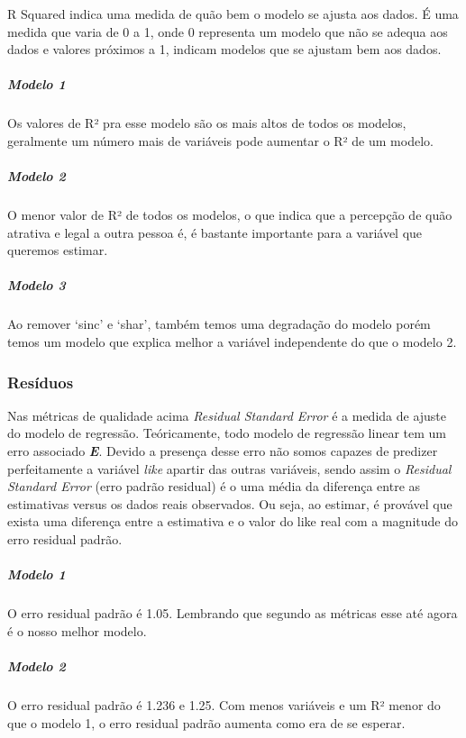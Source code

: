 \documentclass[]{article}
\let\oldsubparagraph\subparagraph
\renewcommand{\subparagraph}[1]{\oldsubparagraph{#1}\mbox{}}
\begin{document}
R Squared indica uma medida de quão bem o modelo se ajusta aos dados. É
uma medida que varia de 0 a 1, onde 0 representa um modelo que não se
adequa aos dados e valores próximos a 1, indicam modelos que se ajustam
bem aos dados.

\hypertarget{modelo-1-2}{%
\subparagraph{Modelo 1}\label{modelo-1-2}}

Os valores de R² pra esse modelo são os mais altos de todos os modelos,
geralmente um número mais de variáveis pode aumentar o R² de um modelo.

\hypertarget{modelo-2-1}{%
\subparagraph{Modelo 2}\label{modelo-2-1}}

O menor valor de R² de todos os modelos, o que indica que a percepção de
quão atrativa e legal a outra pessoa é, é bastante importante para a
variável que queremos estimar.

\hypertarget{modelo-3-1}{%
\subparagraph{Modelo 3}\label{modelo-3-1}}

Ao remover `sinc' e `shar', também temos uma degradação do modelo porém
temos um modelo que explica melhor a variável independente do que o
modelo 2.

\hypertarget{resuxedduos}{%
\subsubsection{Resíduos}\label{resuxedduos}}

Nas métricas de qualidade acima \emph{Residual Standard Error} é a
medida de ajuste do modelo de regressão. Teóricamente, todo modelo de
regressão linear tem um erro associado \textbf{\emph{E}}. Devido a
presença desse erro não somos capazes de predizer perfeitamente a
variável \emph{like} apartir das outras variáveis, sendo assim o
\emph{Residual Standard Error} (erro padrão residual) é o uma média da
diferença entre as estimativas versus os dados reais observados. Ou
seja, ao estimar, é provável que exista uma diferença entre a estimativa
e o valor do like real com a magnitude do erro residual padrão.

\hypertarget{modelo-1-3}{%
\subparagraph{Modelo 1}\label{modelo-1-3}}

O erro residual padrão é 1.05. Lembrando que segundo as métricas esse
até agora é o nosso melhor modelo.

\hypertarget{modelo-2-2}{%
\subparagraph{Modelo 2}\label{modelo-2-2}}

O erro residual padrão é 1.236 e 1.25. Com menos variáveis e um R² menor
do que o modelo 1, o erro residual padrão aumenta como era de se
esperar.
\end{document}
